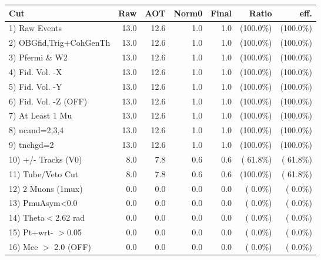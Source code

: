  \begin{table}[h!]\centering
 \begin{tabular}{||l||r|r|r|r|r|r||}
 \hline
 \hline
 Cut & Raw & AOT & Norm0 & Final & Ratio & eff.       \\
 \hline
  1) Raw Events           &         13.0 &         12.6 &          1.0 &          1.0 & (100.0\%) & (100.0\%) \\
  2) OBGfid,Trig+CohGenTh &         13.0 &         12.6 &          1.0 &          1.0 & (100.0\%) & (100.0\%) \\
  3) Pfermi \& W2         &         13.0 &         12.6 &          1.0 &          1.0 & (100.0\%) & (100.0\%) \\
  4) Fid. Vol. -X         &         13.0 &         12.6 &          1.0 &          1.0 & (100.0\%) & (100.0\%) \\
  5) Fid. Vol. -Y         &         13.0 &         12.6 &          1.0 &          1.0 & (100.0\%) & (100.0\%) \\
  6) Fid. Vol. -Z (OFF)   &         13.0 &         12.6 &          1.0 &          1.0 & (100.0\%) & (100.0\%) \\
  7) At Least 1 Mu        &         13.0 &         12.6 &          1.0 &          1.0 & (100.0\%) & (100.0\%) \\
  8) ncand=2,3,4          &         13.0 &         12.6 &          1.0 &          1.0 & (100.0\%) & (100.0\%) \\
  9) tnchgd=2             &         13.0 &         12.6 &          1.0 &          1.0 & (100.0\%) & (100.0\%) \\
 10) +/- Tracks (V0)      &          8.0 &          7.8 &          0.6 &          0.6 & ( 61.8\%) & ( 61.8\%) \\
 11) Tube/Veto Cut        &          8.0 &          7.8 &          0.6 &          0.6 & (100.0\%) & ( 61.8\%) \\
 12) 2 Muons (1mux)       &          0.0 &          0.0 &          0.0 &          0.0 & (  0.0\%) & (  0.0\%) \\
 13) PmuAsym<0.0          &          0.0 &          0.0 &          0.0 &          0.0 & (  0.0\%) & (  0.0\%) \\
 14) Theta$<$2.62 rad     &          0.0 &          0.0 &          0.0 &          0.0 & (  0.0\%) & (  0.0\%) \\
 15) Pt+wrt- $>$0.05      &          0.0 &          0.0 &          0.0 &          0.0 & (  0.0\%) & (  0.0\%) \\
 16) Mee $>$ 2.0  (OFF)   &          0.0 &          0.0 &          0.0 &          0.0 & (  0.0\%) & (  0.0\%) \\

\end{tabular}
\end{table}
